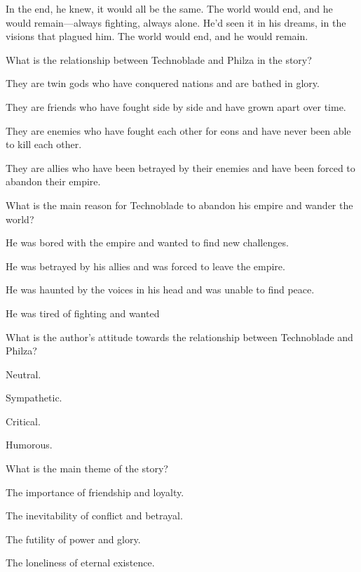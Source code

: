 \documentclass{exam-zh}
\begin{document}
In the end, he knew, it would all be the same. The world would end, and he would remain—always fighting, always alone. He’d seen it in his dreams, in the visions that plagued him. The world would end, and he would remain.

\begin{question}
What is the relationship between Technoblade and Philza in the story?
\begin{choices}
  \item They are twin gods who have conquered nations and are bathed in glory.
  \item They are friends who have fought side by side and have grown apart over time.
  \item They are enemies who have fought each other for eons and have never been able to kill each other.
  \item They are allies who have been betrayed by their enemies and have been forced to abandon their empire.
\end{choices}
\end{question}

\begin{question}
What is the main reason for Technoblade to abandon his empire and wander the world?
\begin{choices}
  \item He was bored with the empire and wanted to find new challenges.
  \item He was betrayed by his allies and was forced to leave the empire.
  \item He was haunted by the voices in his head and was unable to find peace.
  \item He was tired of fighting and wanted
\end{choices}
\end{question}

\begin{question}
What is the author's attitude towards the relationship between Technoblade and Philza?
\begin{choices}
  \item Neutral.
  \item Sympathetic.
  \item Critical.
  \item Humorous.
\end{choices}
\end{question}

\begin{question}
What is the main theme of the story?
\begin{choices}
  \item The importance of friendship and loyalty.
  \item The inevitability of conflict and betrayal.
  \item The futility of power and glory.
  \item The loneliness of eternal existence.
\end{choices}
\end{question}
\end{document}
